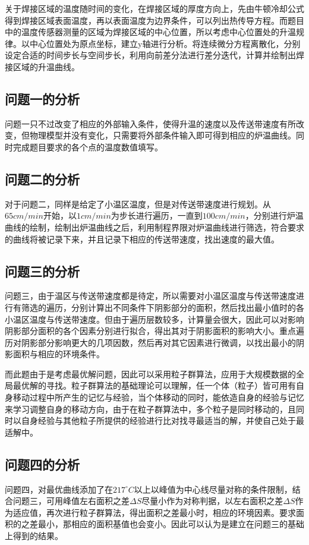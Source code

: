 \documentclass[withoutpreface,bwprint]{cumcmthesis} %
\begin{document}
关于焊接区域的温度随时间的变化，在焊接区域的厚度方向上，先由牛顿冷却公式得到焊接区域表面温度，再以表面温度为边界条件，可以列出热传导方程。而题目中的温度传感器测量的区域为焊接区域的中心位置，所以考虑中心位置处的升温规律。以中心位置处为原点坐标，建立y轴进行分析。将连续微分方程离散化，分别设定合适的时间步长与空间步长，利用向前差分法进行差分迭代，计算并绘制出焊接区域的升温曲线。

\subsection{问题一的分析}
问题一只不过改变了相应的外部输入条件，使得升温的速度以及传送带速度有所改变，但物理模型并没有变化，只需要将外部条件输入即可得到相应的炉温曲线。同时完成题目要求的各个点的温度数值填写。


\subsection{问题二的分析}

对于问题二，同样是给定了小温区温度，但是对传送带速度进行规划。从$65cm/min$开始，以$1cm/min$为步长进行遍历，一直到$100cm/min$，分别进行炉温曲线的绘制，绘制出炉温曲线之后，利用制程界限对炉温曲线进行筛选，符合要求的曲线将被记录下来，并且记录下相应的传送带速度，找出速度的最大值。

\subsection{问题三的分析}
问题三，由于温区与传送带速度都是待定，所以需要对小温区温度与传送带速度进行有筛选的遍历，分别计算出不同条件下阴影部分的面积，然后找出最小值时的各小温区温度与传送带速度。但由于遍历层数较多，计算量会很大，因此可以对影响阴影部分面积的各个因素分别进行拟合，得出其对于阴影面积的影响大小。重点遍历对阴影部分影响更大的几项因数，然后再对其它因素进行微调，以找出最小的阴影面积与相应的环境条件。

而此题由于是考虑最优解问题，因此可以采用粒子群算法，应用于大规模数据的全局最优解的寻找。粒子群算法的基础理论可以理解，任一个体（粒子）皆可用有自身移动过程中所产生的记忆与经验，当个体移动的同时，能依造自身的经验与记忆来学习调整自身的移动方向，由于在粒子群算法中，多个粒子是同时移动的，且同时以自身经验与其他粒子所提供的经验进行比对找寻最适当的解，并使自己处于最适解中。

\subsection{问题四的分析}
问题四，对最优曲线添加了在$217^{\circ}C$以上以峰值为中心线尽量对称的条件限制，结合问题三，可用峰值左右面积之差$\Delta S$尽量小作为对称判据，以左右面积之差$\Delta S$作为适应值，再次进行粒子群算法，得出面积之差最小时，相应的环境因素。要求面积的之差最小，那相应的面积基值也会变小。因此可以认为是建立在问题三的基础上得到的结果。
\end{document}
